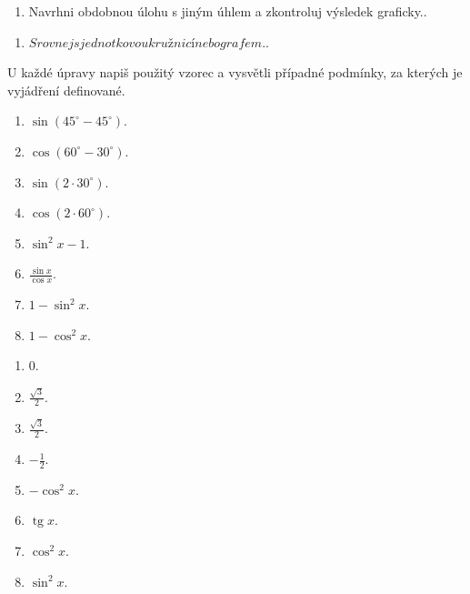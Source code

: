 \documentclass[11pt,a4paper]{article}
\begin{document}
\begin{zadaniReseniBox}[title={Rozšíření 1}]
\begin{enumerate}[label=\alph*)]
\item Navrhni obdobnou úlohu s jiným úhlem a zkontroluj výsledek graficky..
\end{enumerate}
\tcblower
\begin{enumerate}[label=\alph*)]
\item $Srovnej s jednotkovou kružnicí nebo grafem.$.
\end{enumerate}
\end{zadaniReseniBox}
U každé úpravy napiš použitý vzorec a vysvětli případné podmínky, za kterých je vyjádření definované.
\begin{zadaniReseniBox}[title={Domácí úkol}]
\begin{enumerate}[label=\alph*)]
\item $\sin(45^\circ-45^\circ)$.
\item $\cos(60^\circ-30^\circ)$.
\item $\sin(2\cdot30^\circ)$.
\item $\cos(2\cdot60^\circ)$.
\item $\sin^2x-1$.
\item $\frac{\sin x}{\cos x}$.
\item $1-\sin^2x$.
\item $1-\cos^2x$.
\end{enumerate}
\tcblower
\begin{enumerate}[label=\alph*)]
\item $0$.
\item $\frac{\sqrt3}{2}$.
\item $\frac{\sqrt3}{2}$.
\item $-\frac{1}{2}$.
\item $-\cos^2x$.
\item $\operatorname{tg}x$.
\item $\cos^2x$.
\item $\sin^2x$.
\end{enumerate}
\end{zadaniReseniBox}
\end{document}
